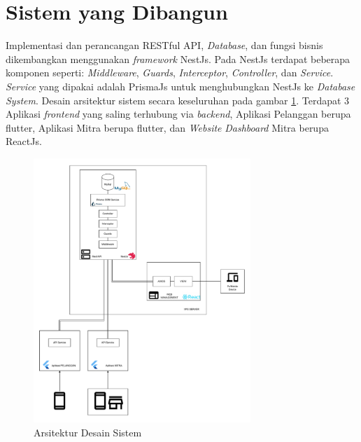 \newpage
\section{Sistem yang Dibangun}

Implementasi dan perancangan RESTful API, \textit{Database}, dan fungsi bisnis dikembangkan menggunakan \textit{framework} NestJs. Pada NestJs terdapat beberapa komponen seperti: \textit{Middleware}, \textit{Guards}, \textit{Interceptor}, \textit{Controller}, dan \textit{Service}. \textit{Service} yang dipakai adalah PrismaJs untuk menghubungkan NestJs ke \textit{Database System}. Desain arsitektur sistem secara keseluruhan pada gambar \ref{sistem-desain-arsitektur}. Terdapat 3 Aplikasi \textit{frontend} yang saling terhubung via \textit{backend}, Aplikasi Pelanggan berupa flutter, Aplikasi Mitra berupa flutter, dan \textit{Website} \textit{Dashboard} Mitra berupa ReactJs.
\begin{figure}[h]
  \centering
  \includegraphics[width=0.73\textwidth]{drawio/System-Design-Architecture.drawio.pdf}
  \caption{Arsitektur Desain Sistem}
  \label{sistem-desain-arsitektur}
\end{figure}
\newpage
